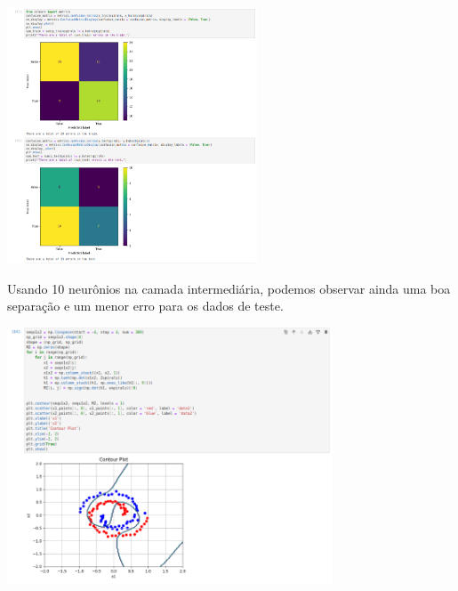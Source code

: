 \documentclass{article}
\begin{document}
\begin{center}

\includegraphics[height=3in]{exercise_pic/spirals/conf_matrix_spirals_5.png}
\vspace{10pt}
    
\end{center}
Usando 10 neurônios na camada intermediária, podemos observar ainda uma boa separação e um menor erro para os dados de teste.

\begin{center}

\includegraphics[height=3in]{exercise_pic/spirals/plot_graph_sep_spirals_10.png}
\vspace{10pt}

\end{center}
\end{document}
